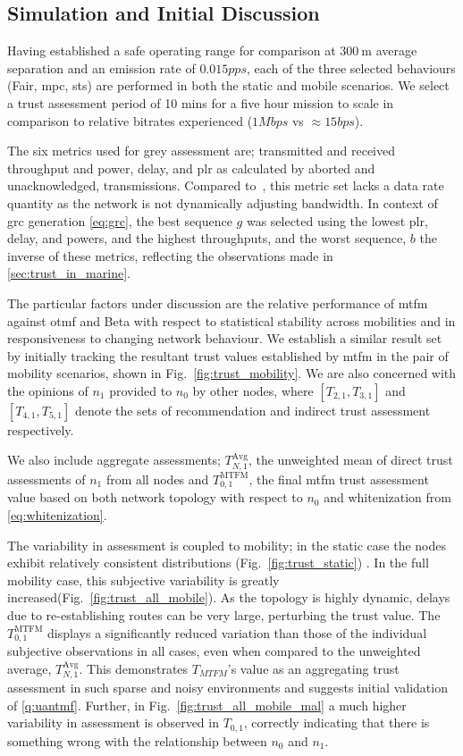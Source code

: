 \subsection{Simulation and Initial Discussion}\label{sec:trustresultsanddiscussion}

Having established a safe operating range for comparison at $\SI{300}{\meter}$ average separation and an emission rate of $0.015pps$, each of the three selected behaviours (Fair, \gls{mpc}, \gls{sts}) are performed in both the static and mobile scenarios. 
We select a trust assessment period of 10 mins for a five hour mission to scale in comparison to relative bitrates experienced ($1Mbps$ vs $\approx15bps$).

The six metrics used for grey assessment are; transmitted and received throughput and power, delay, and \gls{plr} as calculated by aborted and unacknowledged, transmissions.
Compared to~\cite{Guo11}, this metric set lacks a data rate quantity as the network is not dynamically adjusting bandwidth.
In context of \gls{grc} generation \autoref{eq:grc}, the best sequence $g$ was selected using the lowest \gls{plr}, delay, and powers, and the highest throughputs, and the worst sequence, $b$ the inverse of these metrics, reflecting the observations made in \autoref{sec:trust_in_marine}.

The particular factors under discussion are the relative performance of \gls{mtfm} against \gls{otmf} and Beta with respect to statistical stability across mobilities and in responsiveness to changing network behaviour. 
We establish a similar result set by initially tracking the resultant trust values established by \gls{mtfm} in the pair of mobility scenarios, shown in Fig.~\ref{fig:trust_mobility}.
We are also concerned with the opinions of $n_1$ provided to $n_0$ by other nodes, where $[T_{2,1},T_{3,1}]$ and $[T_{4,1},T_{5,1}]$ denote the sets of recommendation and indirect trust assessment respectively.

We also include aggregate assessments; $T_{N,1}^\text{Avg}$, the unweighted mean of direct trust assessments of $n_1$ from all nodes and $T_{0,1}^\text{MTFM}$, the final \gls{mtfm} trust assessment value based on both network topology with respect to $n_0$ and whitenization from \autoref{eq:whitenization}.

The variability in assessment is coupled to mobility; in the static case the nodes exhibit relatively consistent distributions (Fig.~\ref{fig:trust_static}) .
In the full mobility case, this subjective variability is greatly increased(Fig.~\ref{fig:trust_all_mobile}). 
As the topology is highly dynamic, delays due to re-establishing routes can be very large, perturbing the trust value.
The $T_{0,1}^\text{MTFM}$ displays a significantly reduced variation than those of the individual subjective observations in all cases, even when compared to the unweighted average, $T_{N,1}^\text{Avg}$.
This demonstrates $T_{MTFM}$'s value as an aggregating trust assessment in such sparse and noisy environments and suggests initial validation of \autoref{q:uantmf}.
Further, in Fig.~\ref{fig:trust_all_mobile_mal} a much higher variability in assessment is observed in $T_{0,1}$, correctly indicating that there is something wrong with the relationship between $n_0$ and $n_1$.

